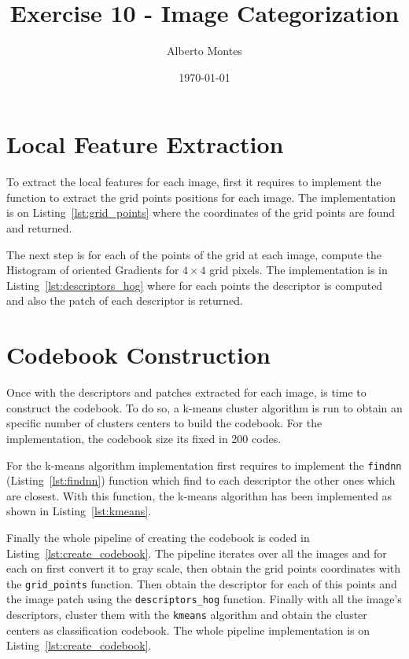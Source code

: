 \documentclass{ethz_report}
\title{Exercise 10 - Image Categorization}
\author{Alberto Montes}
\date{\today}
\begin{document}
\maketitle

\section*{Local Feature Extraction}

To extract the local features for each image, first it requires to implement the function to extract the grid points positions for each image.
The implementation is on Listing~\ref{lst:grid_points} where the coordinates of the grid points are found and returned.



The next step is for each of the points of the grid at each image, compute the Histogram of oriented Gradients for $4 \times 4$ grid pixels. The implementation is in Listing~\ref{lst:descriptors_hog} where for each points the descriptor is computed and also the patch of each descriptor is returned.



\section*{Codebook Construction}

Once with the descriptors and patches extracted for each image, is time to construct the codebook.
To do so, a k-means cluster algorithm is run to obtain an specific number of clusters centers to build the codebook. For the implementation, the codebook size its fixed in 200 codes.

For the k-means algorithm implementation first requires to implement the \texttt{findnn} (Listing~\ref{lst:findnn}) function which find to each descriptor the other ones which are closest.
With this function, the k-means algorithm has been implemented as shown in Listing~\ref{lst:kmeans}.





Finally the whole pipeline of creating the codebook is coded in Listing~\ref{lst:create_codebook}.
The pipeline iterates over all the images and for each on first convert it to gray scale, then obtain the grid points coordinates with the \texttt{grid\_points} function. Then obtain the descriptor for each of this points and the image patch using the \texttt{descriptors\_hog} function.
Finally with all the image's descriptors, cluster them with the \texttt{kmeans} algorithm and obtain the cluster centers as classification codebook. The whole pipeline implementation is on Listing~\ref{lst:create_codebook}.
\end{document}
